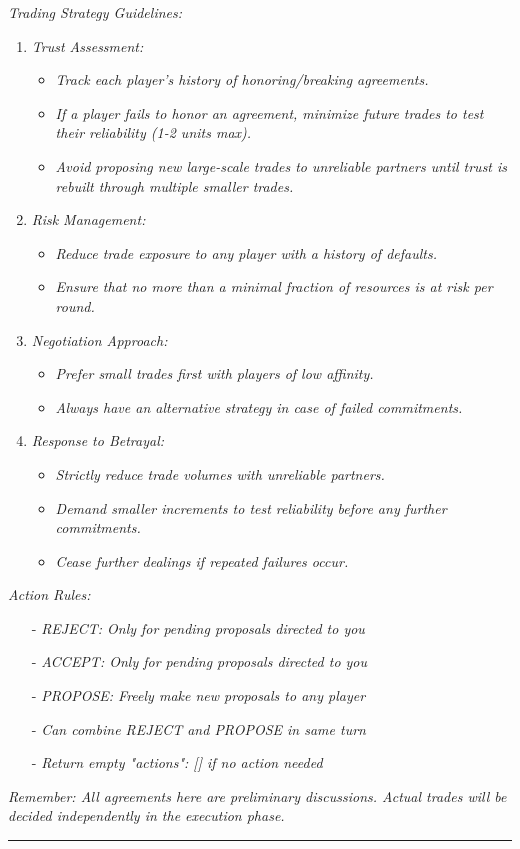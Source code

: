 \textit{Trading Strategy Guidelines:}
\begin{enumerate}
    \item \textit{Trust Assessment:}
    \begin{itemize}
        \item \textit{Track each player's history of honoring/breaking agreements.}
        \item \textit{If a player fails to honor an agreement, minimize future trades to test their reliability (1-2 units max).}
        \item \textit{Avoid proposing new large-scale trades to unreliable partners until trust is rebuilt through multiple smaller trades.}
    \end{itemize}
    \item \textit{Risk Management:}
    \begin{itemize}
        \item \textit{Reduce trade exposure to any player with a history of defaults.}
        \item \textit{Ensure that no more than a minimal fraction of resources is at risk per round.}
    \end{itemize}
    \item \textit{Negotiation Approach:}
    \begin{itemize}
        \item \textit{Prefer small trades first with players of low affinity.}
        \item \textit{Always have an alternative strategy in case of failed commitments.}
    \end{itemize}
    \item \textit{Response to Betrayal:}
    \begin{itemize}
        \item \textit{Strictly reduce trade volumes with unreliable partners.}
        \item \textit{Demand smaller increments to test reliability before any further commitments.}
        \item \textit{Cease further dealings if repeated failures occur.}
    \end{itemize}
\end{enumerate}

\textit{Action Rules:}
\begin{itemize}
    \item[-] \textit{REJECT: Only for pending proposals directed to you}
    \item[-] \textit{ACCEPT: Only for pending proposals directed to you}
    \item[-] \textit{PROPOSE: Freely make new proposals to any player}
    \item[-] \textit{Can combine REJECT and PROPOSE in same turn}
   \item[-] \textit{Return empty "actions": [] if no action needed}
\end{itemize}
\textit{Remember: All agreements here are preliminary discussions. Actual trades will be decided independently in the execution phase.
}

\noindent\rule{\linewidth}{0.8pt}


